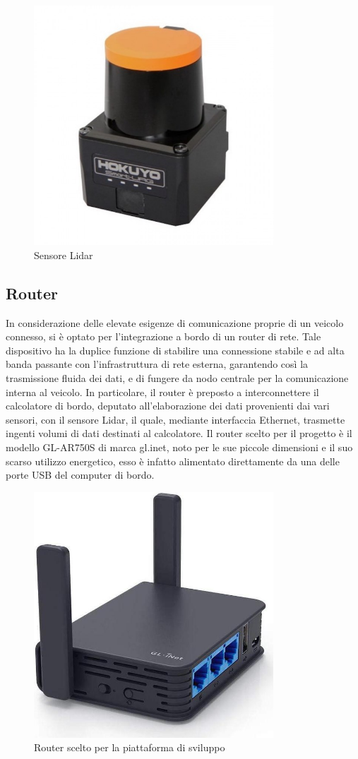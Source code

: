 \begin{figure}[h!]
  \centering
  \includegraphics[width=0.8\textwidth]{figures/sensore_hokuio.jpg}
  \caption{Sensore Lidar}
  \label{Sensore Lidar}
\end{figure}

\subsection{Router}
In considerazione delle elevate esigenze di comunicazione proprie di un veicolo connesso, si è optato per l'integrazione a bordo di un router di rete. Tale dispositivo ha la duplice funzione di stabilire una connessione stabile e ad alta banda passante con l'infrastruttura di rete esterna, garantendo così la trasmissione fluida dei dati, e di fungere da nodo centrale per la comunicazione interna al veicolo. In particolare, il router è preposto a interconnettere il calcolatore di bordo, deputato all'elaborazione dei dati provenienti dai vari sensori, con il sensore Lidar, il quale, mediante interfaccia Ethernet, trasmette ingenti volumi di dati destinati al calcolatore. Il router scelto per il progetto è il modello GL-AR750S di marca gl.inet, noto per le sue piccole dimensioni e il suo scarso utilizzo energetico, esso è infatto alimentato direttamente da una delle porte USB del computer di bordo.

\begin{figure}[H]
  \centering
  \includegraphics[width=0.8\textwidth]{figures/router.jpg}
  \caption{Router scelto per la piattaforma di sviluppo}
  \label{router}
\end{figure}
